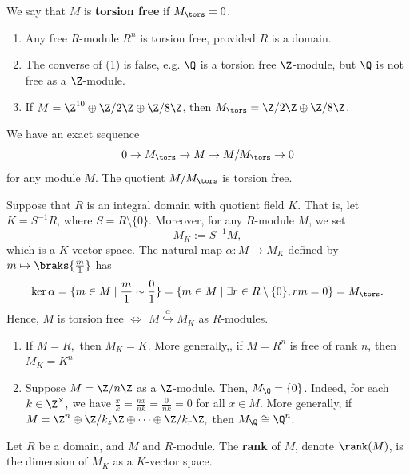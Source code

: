 \begin{defn}
    We say that $M$ is \textbf{torsion free} if $M_{\tors} = 0$.
\end{defn}

\begin{ex}
    \begin{enumerate}
        \item Any free $R$-module $R^n$ is torsion free, provided $R$ is a domain.
        \item The converse of (1) is false, e.g. $\Q$ is a torsion free $\Z$-module, but $\Q$ is not free as a $\Z$-module.
        \item If $M = \Z^{10}\oplus \Z/2\Z \oplus \Z/8\Z$, then $M_{\tors}=\Z/2\Z \oplus \Z/8\Z$.
    \end{enumerate}
\end{ex}

\begin{prop}
    We have an exact sequence
    $$0 \to M_{\tors} \to M \to M/M_{\tors} \to 0$$
    for any module $M$. The quotient $M/M_{\tors}$ is torsion free.
\end{prop}

Suppose that $R$ is an integral domain with quotient field $K$. That is, let $K = S^{-1}R$, where $S = R \setminus \{0\}$. Moreover, for any $R$-module $M$, we set
$$M_K := S^{-1}M,$$
which is a $K$-vector space. The natural map $\alpha : M \to M_K$ defined by $m \mapsto \braks{\frac{m}{1}}$ has
$$\ker \alpha = \{ m \in M \mid \frac{m}{1} \sim \frac{0}{1}\} = \{ m \in M \mid \exists r \in R \setminus\{0\}, rm=0\} = M_{\tors}.$$
Hence, $M$ is torsion free $\iff$ $M \overset{\alpha}{\hookrightarrow} M_K$ as $R$-modules.

\begin{ex}
    \begin{enumerate}
        \item If $M=R,$ then $M_K=K$. More generally,, if $M = R^n$ is free of rank $n$, then $M_K = K^n$
        \item Suppose $M = \Z/n\Z$ as a $\Z$-module. Then, $M_\Q = \{0 \}$. Indeed, for each $k \in \Z^\times,$ we have $\frac{x}{k}=\frac{nx}{nk}=\frac{0}{nk}=0$ for all $x \in M$. More generally, if $M = \Z^n \oplus \Z/k_z\Z \oplus \cdots \oplus \Z/k_r\Z,$ then $M_\Q \cong \Q^n$.
    \end{enumerate}
\end{ex}
\begin{defn}
    Let $R$ be a domain, and $M$ and $R$-module. The \textbf{rank} of $M$, denote $\rank(M)$, is the dimension of $M_K$ as a $K$-vector space.
\end{defn}


